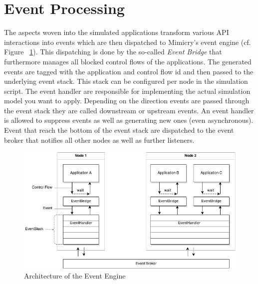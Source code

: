 \documentclass[a4paper,oneside]{book}
\begin{document}
\section{Event Processing}
The aspects woven into the simulated applications transform various API interactions into events which are then dispatched to Mimicry's event engine (cf. Figure ~\ref{fig:EventEngine}). This dispatching is done by the so-called \textit{Event Bridge} that furthermore manages all blocked control flows of the applications. The generated events are tagged with the application and control flow id and then passed to the underlying event stack. This stack can be configured per node in the simulation script. The event handler are responsible for implementing the actual simulation model you want to apply. Depending on the direction events are passed through the event stack they are called downstream or upstream events. An event handler is allowed to suppress events as well as generating new ones (even asynchronous). Event that reach the bottom of the event stack are dispatched to the event broker that notifies all other nodes as well as further listeners.
\begin{figure}
\begin{center}
\includegraphics[width=\textwidth]{EventStack.png}
\caption{Architecture of the Event Engine}
\label{fig:EventEngine}
\end{center}
\end{figure}
\end{document}
